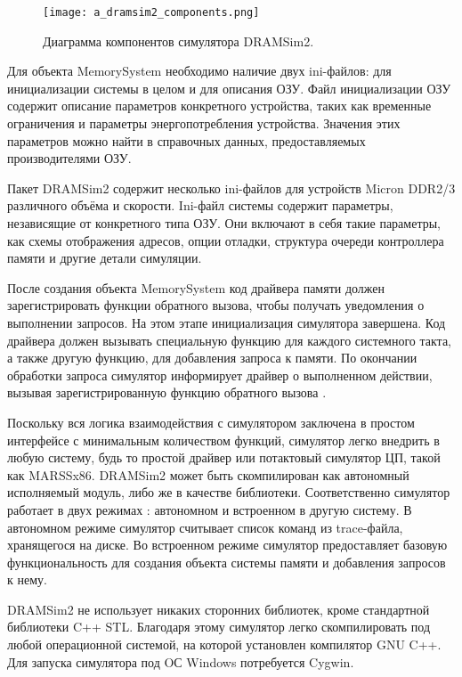 \begin{figure}[ht]
\centering
  \texttt{[image: a\_dramsim2\_components.png]}  
  \caption{ Диаграмма компонентов симулятора DRAMSim2. }
  \label{fig:domain:simulators:dramsim2:dramsim2_component}
\end{figure}

Для объекта MemorySystem необходимо наличие двух ini-файлов: для инициализации системы в целом и для описания ОЗУ. Файл инициализации ОЗУ содержит описание параметров конкретного устройства, таких как временные ограничения и параметры энергопотребления устройства. Значения этих параметров можно найти в справочных данных, предоставляемых производителями ОЗУ.

Пакет DRAMSim2 содержит несколько ini-файлов для устройств Micron DDR2/3 различного объёма и скорости. Ini-файл системы содержит параметры, независящие от конкретного типа ОЗУ. Они включают в себя такие параметры, как схемы отображения адресов, опции отладки, структура очереди контроллера памяти и другие детали симуляции.

После создания объекта  MemorySystem код драйвера памяти должен зарегистрировать функции обратного вызова, чтобы получать уведомления о выполнении запросов. На этом этапе инициализация симулятора завершена. Код драйвера должен вызывать специальную функцию для каждого системного такта, а также другую функцию, для добавления запроса к памяти. По окончании обработки запроса симулятор информирует драйвер о выполненном действии, вызывая зарегистрированную функцию обратного вызова \cite{dramsim2_manual}.

Поскольку вся логика взаимодействия с симулятором заключена в простом интерфейсе с минимальным количеством функций, симулятор  легко внедрить в любую систему, будь то простой драйвер или потактовый симулятор ЦП, такой как MARSSx86. 
DRAMSim2 может быть скомпилирован как автономный исполняемый модуль, либо же в качестве библиотеки. Соответственно симулятор работает в двух режимах : автономном и встроенном в другую систему. В автономном режиме симулятор считывает список команд из trace-файла, хранящегося на диске. Во встроенном режиме симулятор предоставляет базовую функциональность для создания объекта системы памяти и добавления запросов к нему. 

DRAMSim2 не использует никаких сторонних библиотек, кроме стандартной библиотеки C++ STL. Благодаря этому симулятор легко скомпилировать под любой операционной системой, на которой установлен компилятор GNU C++. Для запуска симулятора под OС Windows потребуется Cygwin.

